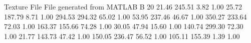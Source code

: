 Texture File
File generated from MATLAB
B 20
   21.46   245.51    3.82   1.00
   25.72   187.79    8.71   1.00
   294.53   294.32   65.02   1.00
   53.95   237.46   46.67   1.00
   350.27   233.64   72.03   1.00
   163.37   155.66   74.28   1.00
   30.05   47.94   15.60   1.00
   140.74   299.30   72.30   1.00
   21.77   143.73   47.42   1.00
   150.05   236.47   56.52   1.00
   105.11   155.39    1.39   1.00